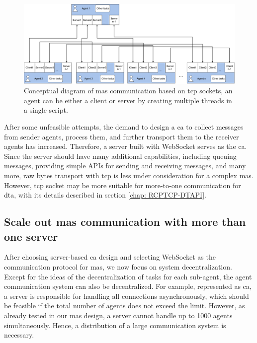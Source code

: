 \begin{figure}[htb]
    \centering
    \includegraphics[width=\textwidth]{figures/threads_MAS.pdf}

    \caption{Conceptual diagram of \gls{mas} communication based on 
    \gls{tcp} sockets, an agent can be either a client or server by creating 
    multiple threads in a single script. \label{fig: threadMASConceptual}}
\end{figure}



After some unfeasible attempts, the demand to design a \gls{ca} to collect 
messages from sender agents, process them, and further transport them to the 
receiver agents has increased. Therefore, a server built with WebSocket serves 
as the \gls{ca}. Since the server should have many additional 
capabilities, including queuing messages, providing simple APIs for sending 
and receiving messages, and many more, raw bytes transport with \gls{tcp} is 
less under consideration for a complex \gls{mas}. However, \gls{tcp} socket 
may be more suitable for more-to-one communication for \gls{dta}, 
with its details described in section \ref{chap: RCPTCP-DTAPI}.  



\subsection{Scale out \gls{mas} communication with more than one server}
After choosing server-based \gls{ca} design and selecting WebSocket as the 
communication protocol for \gls{mas}, we now focus on system decentralization.  
Except for the ideas of the decentralization of tasks for each sub-agent, the agent 
communication system can also be decentralized. For example, represented as \gls{ca}, 
a server is responsible for handling all connections asynchronously, which should be 
feasible if the total number of agents does not exceed the limit. However, as already 
tested in our \gls{mas} design, a server cannot handle up to 1000 agents simultaneously. 
Hence, a distribution of a large communication system is necessary. 


